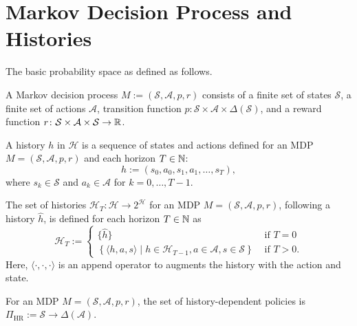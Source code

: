 \section{Markov Decision Process and Histories}

The basic probability space as defined as follows.
\begin{definition}
  A Markov decision process $M := (\mathcal{S}, \mathcal{A}, p, r)$ consists of a finite set of states $\mathcal{S}$, a finite set of actions $\mathcal{A}$, transition function $p\colon \mathcal{S} \times \mathcal{A} \times \Delta(\mathcal{S})$, and a reward function $r \colon \mathcal{S} \times \mathcal{A} \times \mathcal{S} \to \mathbb{R}$.
 \leanok
\end{definition}

\begin{definition}[History]
A history $h$ in $\mathcal{H}$ is a sequence of states and actions defined for an MDP $M = (\mathcal{S}, \mathcal{A}, p, r)$ and each horizon $T \in \mathbb{N}$:
\[
h := (s_0, a_0, s_1, a_1, \dots , s_T),
\]
where $s_k \in \mathcal{S}$ and $a_k\in \mathcal{A}$ for $k = 0, \dots , T-1$.
 \leanok
\end{definition}

\begin{definition}[Histories]
  The set of histories $\mathcal{H}_T \colon  \mathcal{H} \to 2^{\mathcal{H}}$ for an MDP $M = (\mathcal{S}, \mathcal{A}, p, r)$, following a history $\hat{h}$, is defined for each horizon $T \in \mathbb{N}$ as
  \[
    \mathcal{H}_T :=
    \begin{cases}
        \{ \hat{h} \} &\text{ if } T = 0 \\      
        \left\{ \langle h, a, s \rangle \mid h \in \mathcal{H}_{T-1}, a\in \mathcal{A}, s\in \mathcal{S} \right\} &\text{ if } T > 0.
    \end{cases}
  \]
  Here, $\langle \cdot , \cdot , \cdot  \rangle$ is an append operator to augments the history with the action and state.
  \leanok
\end{definition}

\begin{definition}
  For an MDP $M = (\mathcal{S}, \mathcal{A}, p, r)$, the set of history-dependent policies is $\Pi_{\mathrm{HR}} := \mathcal{S} \to \Delta(\mathcal{A})$.
  \leanok
\end{definition}

